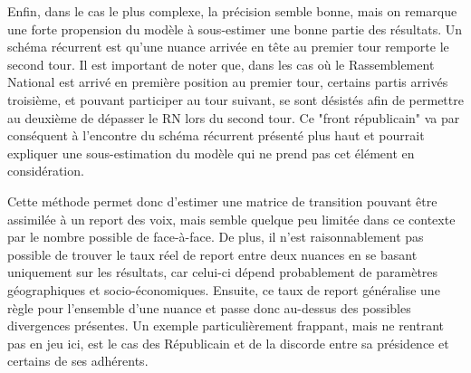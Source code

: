 \documentclass[11pt]{article}
\begin{document}
        Enfin, dans le cas le plus complexe, la précision semble bonne, mais on remarque une forte propension du modèle à sous-estimer une bonne partie des résultats. Un schéma récurrent est qu'une nuance arrivée en tête au premier tour remporte le second tour. Il est important de noter que, dans les cas où le Rassemblement National est arrivé en première position au premier tour, certains partis arrivés troisième, et pouvant participer au tour suivant, se sont désistés afin de permettre au deuxième de dépasser le RN lors du second tour. Ce "front républicain" va par conséquent à l'encontre du schéma récurrent présenté plus haut et pourrait expliquer une sous-estimation du modèle qui ne prend pas cet élément en considération.

        Cette méthode permet donc d'estimer une matrice de transition pouvant être assimilée à un report des voix, mais semble quelque peu limitée dans ce contexte par le nombre possible de face-à-face. De plus, il n'est raisonnablement pas possible de trouver le taux réel de report entre deux nuances en se basant uniquement sur les résultats, car celui-ci dépend probablement de paramètres géographiques et socio-économiques. Ensuite, ce taux de report généralise une règle pour l'ensemble d'une nuance et passe donc au-dessus des possibles divergences présentes. Un exemple particulièrement frappant, mais ne rentrant pas en jeu ici, est le cas des Républicain et de la discorde entre sa présidence et certains de ses adhérents.

    \printbibliography
\end{document}
